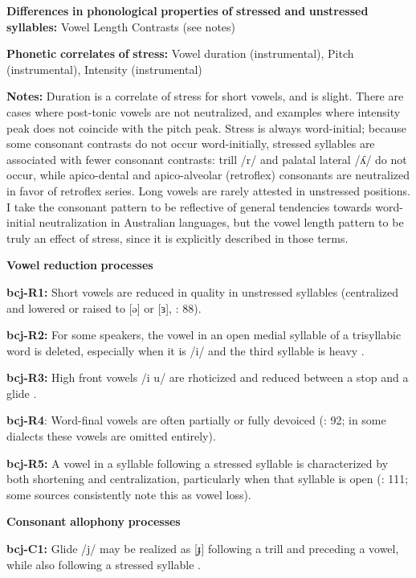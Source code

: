 \begin{styleBody}
\textbf{Differences} \textbf{in} \textbf{phonological} \textbf{properties} \textbf{of} \textbf{stressed} \textbf{and} \textbf{unstressed} \textbf{syllables:} Vowel Length Contrasts (see notes)

\textbf{Phonetic} \textbf{correlates} \textbf{of} \textbf{stress:} Vowel duration (instrumental), Pitch (instrumental), Intensity (instrumental)

\textbf{Notes:} Duration is a correlate of stress for short vowels, and is slight. There are cases where post-tonic vowels are not neutralized, and examples where intensity peak does not coincide with the pitch peak. Stress is always word-initial; because some consonant contrasts do not occur word-initially, stressed syllables are associated with fewer consonant contrasts: trill /r/ and palatal lateral /ʎ/ do not occur, while apico-dental and apico-alveolar (retroflex) consonants are neutralized in favor of retroflex series. Long vowels are rarely attested in unstressed positions. I take the consonant pattern to be reflective of general tendencies towards word-initial neutralization in Australian languages, but the vowel length pattern to be truly an effect of stress, since it is explicitly described in those terms.

\textbf{Vowel} \textbf{reduction} \textbf{processes}

\textbf{bcj-R1:} Short vowels are reduced in quality in unstressed syllables (centralized and lowered or raised to [ə] or [ɜ], \citealt{Bowern2012}: 88).

\textbf{bcj-R2:} For some speakers, the vowel in an open medial syllable of a trisyllabic word is deleted, especially when it is /i/ and the third syllable is heavy \citep[91]{Bowern2012}.

\textbf{bcj-R3:} High front vowels /i u/ are rhoticized and reduced between a stop and a glide \citep[91]{Bowern2012}.

\textbf{bcj-R4}: Word-final vowels are often partially or fully devoiced (\citealt{Bowern2012}: 92; in some dialects these vowels are omitted entirely).

\textbf{bcj-R5:} A vowel in a syllable following a stressed syllable is characterized by both shortening and centralization, particularly when that syllable is open (\citealt{Bowern2012}: 111; some sources consistently note this as vowel loss).

\textbf{Consonant} \textbf{allophony} \textbf{processes}

\textbf{bcj-C1:} Glide /j/ may be realized as [ɟ] following a trill and preceding a vowel, while also following a stressed syllable \citep[80-1]{Bowern2012}.


\end{styleBody}
